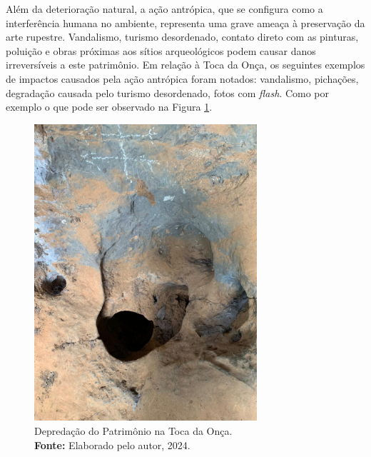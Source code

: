 Além da deterioração natural, a ação antrópica, que se configura como a interferência humana no ambiente, representa uma grave ameaça à preservação da arte rupestre. Vandalismo, turismo desordenado, contato direto com as pinturas, poluição e obras próximas aos sítios arqueológicos podem causar danos irreversíveis a este patrimônio.
Em relação à Toca da Onça, os seguintes exemplos de impactos causados pela ação antrópica foram notados: vandalismo, pichações, degradação causada pelo turismo desordenado, fotos com \textit{flash}. Como por exemplo o que pode ser observado na Figura \ref{fig:degradacao_toca_onca}.

\begin{figure}[H]
    \centering
    \includegraphics[height=11cm, keepaspectratio]{img/jogo da velha.jpeg}
    \caption{Depredação do Patrimônio na Toca da Onça. \\
        \textbf{Fonte:} Elaborado pelo autor, 2024.}
    \label{fig:degradacao_toca_onca}
\end{figure}






